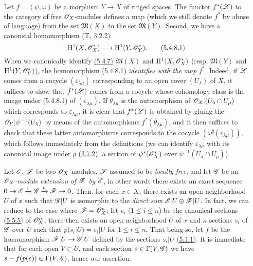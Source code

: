\begin{env}[5.4.8]
\label{env-0.5.4.8}
Let $f=(\psi,\omega)$ be a morphism $Y\to X$ of ringed spaces. The functor
$f^*(\mathscr{L})$ to the category of free $\mathscr{O}_X$-modules defines a map (which we
still denote $f^*$ by abuse of language) from the set $\mathfrak{M}(X)$ to the
set $\mathfrak{M}(Y)$. Second, we have a canonical homomorphism (T, 3.2.2)
\[
  \mathrm{H}^1(X,\mathscr{O}_X^*)\longrightarrow\mathrm{H}^1(Y,\mathscr{O}_Y^*).
  \tag{5.4.8.1}
\]
When we canonically identify \hyperref[env-0.5.4.7]{(5.4.7)} $\mathfrak{M}(X)$ and
$\mathrm{H}^1(X,\mathscr{O}_X^*)$ (resp. $\mathfrak{M}(Y)$ and $\mathrm{H}^1(Y,\mathscr{O}_Y^*)$), the
homomorphism (5.4.8.1) {\em identifies with the map $f^*$}. Indeed, if $\mathscr{L}$
comes from a cocycle $(\varepsilon_{\lambda\mu})$ corresponding to an open cover
$(U_\lambda)$ of $X$, it suffices to show that $f^*(\mathscr{L})$ comes from a
cocycle whose cohomology class is the image under (5.4.8.1) of
$(\varepsilon_{\lambda\mu})$. If $\theta_{\lambda\mu}$ is the automorphism of
$\mathscr{O}_X|(U_\lambda\cap U_\mu)$ which corresponds to $\varepsilon_{\lambda\mu}$,
it is clear that $f^*(\mathscr{L})$ is obtained by gluing the
$\mathscr{O}_Y|\psi^{-1}(U_\lambda)$ by means of the automorphisms
$f^*(\theta_{\lambda\mu})$, and it then suffices to check that these latter
automorphisms corresponds to the cocycle
$(\omega^\sharp(\varepsilon_{\lambda\mu}))$, which follows immediately from the
definitions (we can identify $\varepsilon_{\lambda\mu}$ with its canonical image
under $\rho$ \hyperref[env-0.3.7.2]{(3.7.2)}, a section of $\psi^*(\mathscr{O}_X^*)$ over
$\psi^{-1}(U_\lambda\cap U_\mu)$).
\end{env}

\begin{env}[5.4.9]
\label{env-0.5.4.9}
Let $\mathscr{E}$, $\mathscr{F}$ be two $\mathscr{O}_X$-modules, $\mathscr{F}$ assumed to be
{\em locally free}, and let $\mathscr{G}$ be an {\em $\mathscr{O}_X$-module extension of
$\mathscr{F}$ by $\mathscr{E}$}, in other words there exists an exact sequence
$0\to\mathscr{E}\xrightarrow{i}\mathscr{G}\xrightarrow{p}\mathscr{F}\to 0$. Then, for each
$x\in X$, there exists an open neighborhood $U$ of $x$ such that $\mathscr{G}|U$ is
isomorphic to the {\em direct sum $\mathscr{E}|U\oplus\mathscr{F}|U$}. In fact, we can
reduce to the case where $\mathscr{F}=\mathscr{O}_X^n$; let $e_i$ ($1\leqslant i\leqslant n$)
be the canonical sections \hyperref[env-0.5.5.5]{(5.5.5)} of $\mathscr{O}_X^n$; there then exists an
open neighborhood $U$ of $x$ and $n$ sections $s_i$ of $\mathscr{G}$ over $U$ such
that $p(s_i|U)=e_i|U$ for $1\leqslant i\leqslant n$. That being so, let $f$ be
the homomorphism $\mathscr{F}|U\to\mathscr{G}|U$ defined by the sections $s_i|U$
\hyperref[env-0.5.1.1]{(5.1.1)}. It is immediate that for each open $V\subset U$, and each
section $s\in\Gamma(V,\mathscr{G})$ we have $s-f(p(s))\in\Gamma(V,\mathscr{E})$, hence our
assertion.
\end{env}

